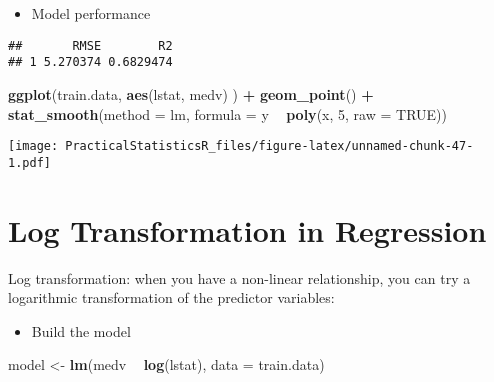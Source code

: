 \documentclass[
]{article}
\newenvironment{Shaded}{\begin{snugshade}}{\end{snugshade}}
\newcommand{\DataTypeTok}[1]{\textcolor[rgb]{0.13,0.29,0.53}{#1}}
\newcommand{\DecValTok}[1]{\textcolor[rgb]{0.00,0.00,0.81}{#1}}
\newcommand{\KeywordTok}[1]{\textcolor[rgb]{0.13,0.29,0.53}{\textbf{#1}}}
\newcommand{\NormalTok}[1]{#1}
\newcommand{\OperatorTok}[1]{\textcolor[rgb]{0.81,0.36,0.00}{\textbf{#1}}}
\newcommand{\OtherTok}[1]{\textcolor[rgb]{0.56,0.35,0.01}{#1}}
\newcommand{\StringTok}[1]{\textcolor[rgb]{0.31,0.60,0.02}{#1}}
\providecommand{\tightlist}{%
  \setlength{\itemsep}{0pt}\setlength{\parskip}{0pt}}
\begin{document}
\begin{itemize}
\tightlist
\item
  Model performance
\end{itemize}

\begin{Shaded}
\end{Shaded}

\begin{verbatim}
##       RMSE        R2
## 1 5.270374 0.6829474
\end{verbatim}

\begin{Shaded}
\begin{Highlighting}[]
\KeywordTok{ggplot}\NormalTok{(train.data, }\KeywordTok{aes}\NormalTok{(lstat, medv) ) }\OperatorTok{+}
\StringTok{  }\KeywordTok{geom_point}\NormalTok{() }\OperatorTok{+}
\StringTok{  }\KeywordTok{stat_smooth}\NormalTok{(}\DataTypeTok{method =}\NormalTok{ lm, }\DataTypeTok{formula =}\NormalTok{ y }\OperatorTok{~}\StringTok{ }\KeywordTok{poly}\NormalTok{(x, }\DecValTok{5}\NormalTok{, }\DataTypeTok{raw =} \OtherTok{TRUE}\NormalTok{))}
\end{Highlighting}
\end{Shaded}

\texttt{[image: PracticalStatisticsR\_files/figure-latex/unnamed-chunk-47-1.pdf]}

\hypertarget{log-transformation-in-regression}{%
\section{Log Transformation in
Regression}\label{log-transformation-in-regression}}

Log transformation: when you have a non-linear relationship, you can try
a logarithmic transformation of the predictor variables:

\begin{itemize}
\tightlist
\item
  Build the model
\end{itemize}

\begin{Shaded}
\begin{Highlighting}[]
\NormalTok{model <-}\StringTok{ }\KeywordTok{lm}\NormalTok{(medv }\OperatorTok{~}\StringTok{ }\KeywordTok{log}\NormalTok{(lstat), }\DataTypeTok{data =}\NormalTok{ train.data)}
\end{Highlighting}
\end{Shaded}
\end{document}
